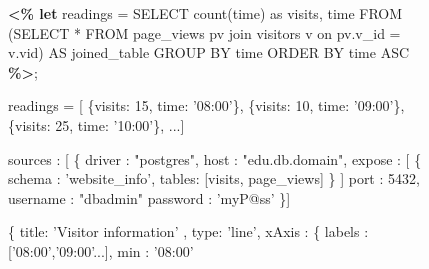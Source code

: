  \begin{figure}[hbt!]
 \centering
 \begin{minipage}[c]{7cm}
 \begin{minipage}[c]{7cm}
 \begin{code}
 \textbf{<\% let} readings = 
    SELECT count(time) as visits, time
    FROM (SELECT * FROM page_views pv 
   	     join visitors v 
          on pv.v_id = v.vid) AS joined_table
    GROUP BY time 
    ORDER BY time ASC \textbf{\%>};
 \end{code}
 \vspace*{-0.4cm}
 \label{figure:first-running-example:data-retrieval}
 \vspace*{0.3cm}
 \end{minipage}
 \begin{minipage}[c]{7cm}
 \begin{code}
 readings = [
    \{visits: 15, time: '08:00'\}, 
    \{visits: 10, time: '09:00'\},
    \{visits: 25, time: '10:00'\},  ...]
 \end{code}
 \vspace*{-0.4cm}
 \label{figure:running-example:query-result}
 \vspace*{0.3cm}
 \end{minipage}
 \begin{minipage}[c]{7cm}
 \begin{code}
 sources : [ \{ 
      driver   : "postgres", 
      host     : "edu.db.domain", 
      expose   : [ \{
       schema : 'website_info', 
       tables: [visits, page_views] \} ]
      port     : 5432, 
      username : "dbadmin" 
      password : 'myP@ss'
    \}] 
 \end{code}
 \vspace*{-0.4cm}
 \vspace*{0.3cm}
 \label{figure:source-config-file}
 \end{minipage}
 \vspace*{0.6cm}
 \end{minipage}
 \hspace{2cm}
 \begin{minipage}[c]{6cm}
 \begin{minipage}[c]{7.5cm}
 \begin{code}
    \{
     title: 'Visitor information' ,
     type: 'line',
     xAxis : \{ 
       labels : ['08:00','09:00'...],
       min : '08:00'

\end{code}
\end{minipage}
\end{minipage}
\end{figure}
